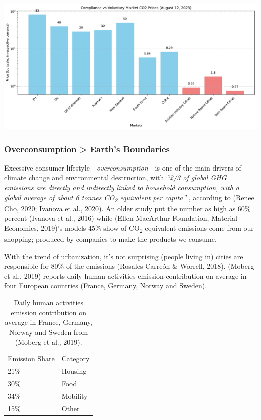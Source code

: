 \documentclass[
  letterpaper,
  DIV=11,
  numbers=noendperiod]{scrartcl}
\begin{document}
\includegraphics{_thesis_files/figure-pdf/cell-13-output-1.pdf}

\subsubsection{Overconsumption \textgreater{} Earth's
Boundaries}\label{overconsumption-earths-boundaries}

Excessive consumer lifestyle - \emph{overconsumption} - is one of the
main drivers of climate change and environmental destruction, with
\emph{``2/3 of global GHG emissions are directly and indirectly linked
to household consumption, with a global average of about 6 tonnes
CO\textsubscript{2} equivalent per capita''} , according to (Renee Cho,
2020; Ivanova et al., 2020). An older study put the number as high as
60\% percent (Ivanova et al., 2016) while (Ellen MacArthur Foundation,
Material Economics, 2019)'s models 45\% show of CO\textsubscript{2}
equivalent emissions come from our shopping; produced by companies to
make the products we consume.

With the trend of urbanization, it's not surprising (people living in)
cities are responsible for 80\% of the emissions (Rosales Carreón \&
Worrell, 2018). (Moberg et al., 2019) reports daily human activities
emission contribution on average in four European countries (France,
Germany, Norway and Sweden).

\begin{longtable}[]{@{}ll@{}}
\caption{Daily human activities emission contribution on average in
France, Germany, Norway and Sweden from (Moberg et al.,
2019).}\tabularnewline
\toprule\noalign{}
\endfirsthead
\endhead
\bottomrule\noalign{}
\endlastfoot
Emission Share & Category \\
21\% & Housing \\
30\% & Food \\
34\% & Mobility \\
15\% & Other \\
\end{longtable}
\end{document}
